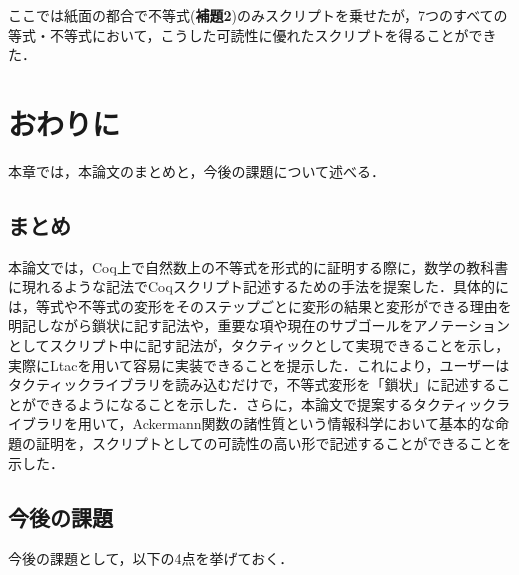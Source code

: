 \documentclass[submit]{ipsj}
\begin{document}
ここでは紙面の都合で不等式({\gtfamily\bfseries 補題2})のみスクリプトを乗せたが，7つのすべての等式・不等式において，こうした可読性に優れたスクリプトを得ることができた．

\section{おわりに}

本章では，本論文のまとめと，今後の課題について述べる．

\subsection{まとめ}

本論文では，Coq上で自然数上の不等式を形式的に証明する際に，数学の教科書に現れるような記法でCoqスクリプト記述するための手法を提案した．具体的には，等式や不等式の変形をそのステップごとに変形の結果と変形ができる理由を明記しながら鎖状に記す記法や，重要な項や現在のサブゴールをアノテーションとしてスクリプト中に記す記法が，タクティックとして実現できることを示し，実際にLtacを用いて容易に実装できることを提示した．これにより，ユーザーはタクティックライブラリを読み込むだけで，不等式変形を「鎖状」に記述することができるようになることを示した．さらに，本論文で提案するタクティックライブラリを用いて，Ackermann関数の諸性質という情報科学において基本的な命題の証明を，スクリプトとしての可読性の高い形で記述することができることを示した．

\subsection{今後の課題}

今後の課題として，以下の4点を挙げておく．
\end{document}
